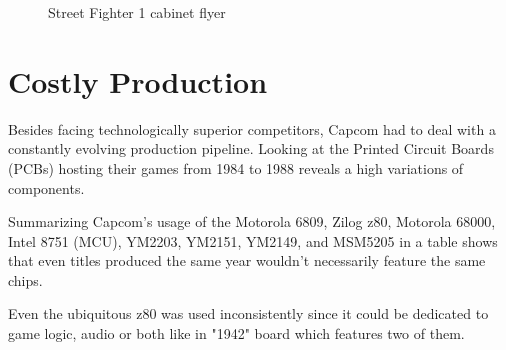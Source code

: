 \begin{figure}[H]
\caption*{Street Fighter 1 cabinet flyer}
\end{figure}


\section{Costly Production}
Besides facing technologically superior competitors, Capcom had to deal with a constantly evolving production pipeline. Looking at the Printed Circuit Boards (PCBs) hosting their games from 1984 to 1988 reveals a high variations of components.

Summarizing Capcom's usage of the Motorola 6809, Zilog z80, Motorola 68000, Intel 8751 (MCU), YM2203, YM2151, YM2149, and MSM5205 in a table shows that even titles produced the same year wouldn't necessarily feature the same chips. 

Even the ubiquitous z80 was used inconsistently since it could be dedicated to game logic, audio or both like in "1942" board which features two of them.



